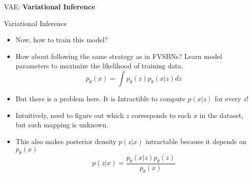 \begin{frame}{}
    \LARGE VAE: \textbf{Variational Inference}
\end{frame}

\begin{frame}{Variational Inference}
\begin{itemize}
    \item Now, how to train this model?
    \item<2-> How about following the same strategy as in FVSBNs? Learn model parameters to maximize the likelihood of training data.
    $$p_{\theta}(x) = \int p_{\theta}(z) p_{\theta}(x|z) dz$$
    \item<3-> But there is a problem here. It is Intractible to compute $p(x|z)$ for every $z$!
    \item<4-> Intuitively, need to figure out which $z$ corresponds to each $x$ in the dataset, but such mapping is unknown.
    \item<5-> This also makes posterior density $p(z|x)$ intractable because it depends on $p_{\theta}(x)$
    $$p(z|x) = \frac{p_{\theta}(x|z) p_{\theta}(z)}{p_{\theta}(x)}$$
\end{itemize}
\end{frame}

